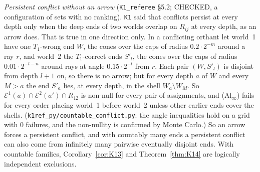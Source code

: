 \documentclass[11pt]{article}
\theoremstyle{definition}
\theoremstyle{remark}
\newcommand{\src}[1]{\texttt{#1}}
\begin{document}
\emph{Persistent conflict without an arrow} (\src{K1\_referee} \S5.2; CHECKED, a configuration of sets with no ranking). \src{K1} said that conflicts persist at every depth only when the deep ends of two worlds overlap on $R_{ij}$ at every depth, as an arrow does. That is true in one direction only. In a conflicting orthant let world~1 have one $T_1$-wrong end $W$, the cones over the caps of radius $0.2\cdot2^{-m}$ around a ray $r$, and world~2 the $T_1$-correct ends $S'_l$, the cones over the caps of radius $0.01\cdot2^{-l-n}$ around rays at angle $0.15\cdot2^{-l}$ from $r$. Each pair $(W,S'_l)$ is disjoint from depth $l+1$ on, so there is no arrow; but for every depth $a$ of $W$ and every $M>a$ the end $S'_a$ lies, at every depth, in the shell $W_a\setminus W_M$. So $\mathcal E^1(a)\cap\mathcal E^2(a')\cap R_{12}$ is non-null for every pair of assignments, and (Al$_\infty$) fails for every order placing world~1 before world~2 unless other earlier ends cover the shells. (\src{k1ref\_py/countable\_conflict.py}: the angle inequalities hold on a grid with 0 failures, and the non-nullity is confirmed by Monte Carlo.) So an arrow forces a persistent conflict, and with countably many ends a persistent conflict can also come from infinitely many pairwise eventually disjoint ends. With countable families, Corollary~\ref{cor:K13} and Theorem~\ref{thm:K14} are logically independent exclusions.
\end{document}
